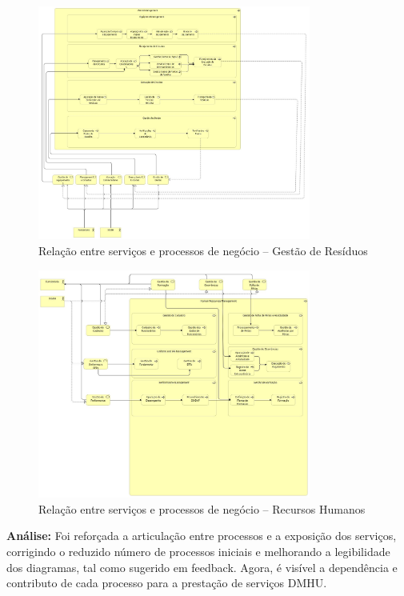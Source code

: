 \documentclass[12pt,a4paper,final]{article}
\begin{document}
    \begin{figure}[H]
        \centering
        \includegraphics[width=0.8\textwidth]{Q4d - Gestão de Resíduos.jpg}
        \caption{Relação entre serviços e processos de negócio – Gestão de Resíduos}
        \label{fig:q4-residuos}
    \end{figure}

    \begin{figure}[H]
        \centering
        \includegraphics[width=0.8\textwidth]{Q4e - Recursos Humanos.jpg}
        \caption{Relação entre serviços e processos de negócio – Recursos Humanos}
        \label{fig:q4-rh}
    \end{figure}

    \textbf{Análise:} Foi reforçada a articulação entre processos e a exposição dos serviços, corrigindo o reduzido número de processos iniciais e melhorando a legibilidade dos diagramas, tal como sugerido em feedback. Agora, é visível a dependência e contributo de cada processo para a prestação de serviços DMHU.
\end{document}
